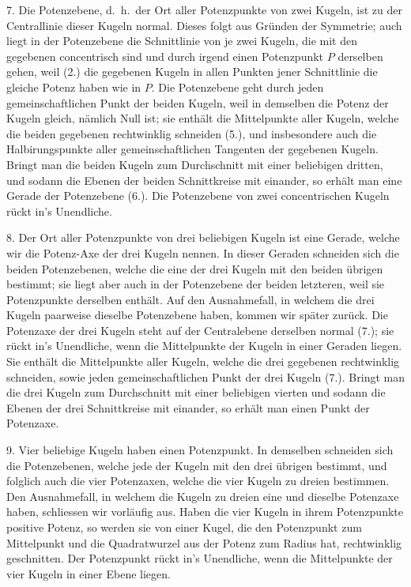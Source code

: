 7. Die Potenzebene, d.~h.\ der Ort aller Potenzpunkte
von zwei Kugeln, ist zu der Centrallinie dieser Kugeln normal.
Dieses folgt aus Gr\"unden der Symmetrie; auch liegt
in der Potenzebene die Schnittlinie von je zwei Kugeln, die
mit den gegebenen concentrisch sind und durch irgend einen
Potenzpunkt $P$ derselben gehen, weil (2.) die gegebenen
Kugeln in allen Punkten jener Schnittlinie die gleiche Potenz
haben wie in $P$. Die Potenzebene geht durch jeden
gemeinschaftlichen Punkt der beiden Kugeln, weil in demselben
die Potenz der Kugeln gleich, n\"amlich Null ist; sie
enth\"alt die Mittelpunkte aller Kugeln, welche die beiden gegebenen
rechtwinklig schneiden (5.), und insbesondere auch
die Halbirungspunkte aller gemeinschaftlichen Tangenten der
gegebenen Kugeln. Bringt man die beiden Kugeln zum
Durchschnitt mit einer beliebigen dritten, und sodann die
Ebenen der beiden Schnittkreise mit einander, so erh\"alt man
eine Gerade der Potenzebene (6.). Die Potenzebene von zwei
concentrischen Kugeln r\"uckt in's Unendliche.

8. Der Ort aller Potenzpunkte von drei beliebigen Kugeln
ist eine Gerade, welche wir die {\glqq}Potenz-Axe{\grqq} der drei
Kugeln nennen. In dieser Geraden schneiden sich die beiden
Potenzebenen, welche die eine der drei Kugeln mit den
beiden \"ubrigen bestimmt; sie liegt aber auch in der Potenzebene
der beiden letzteren, weil sie Potenzpunkte derselben
enth\"alt. Auf den Ausnahmefall, in welchem die drei Kugeln
paarweise dieselbe Potenzebene haben, kommen wir sp\"ater
zur\"uck. Die Potenzaxe der drei Kugeln steht auf der Centralebene
derselben normal (7.); sie r\"uckt in's Unendliche,
wenn die Mittelpunkte der Kugeln in einer Geraden liegen.
Sie enth\"alt die Mittelpunkte aller Kugeln, welche die drei
gegebenen rechtwinklig schneiden, sowie jeden gemeinschaftlichen
Punkt der drei Kugeln (7.). Bringt man die drei
Kugeln zum Durchschnitt mit einer beliebigen vierten und
sodann die Ebenen der drei Schnittkreise mit einander, so
erh\"alt man einen Punkt der Potenzaxe.

9. Vier beliebige Kugeln haben einen Potenzpunkt. In
demselben schneiden sich die Potenzebenen, welche jede der
Kugeln mit den drei \"ubrigen bestimmt, und folglich auch
die vier Potenzaxen, welche die vier Kugeln zu dreien bestimmen.
Den Ausnahmefall, in welchem die Kugeln zu
dreien eine und dieselbe Potenzaxe haben, schliessen wir
vorl\"aufig aus. Haben die vier Kugeln in ihrem Potenzpunkte
positive Potenz, so werden sie von einer Kugel, die den Potenzpunkt
zum Mittelpunkt und die Quadratwurzel aus der
Potenz zum Radius hat, rechtwinklig geschnitten. Der Potenzpunkt
r\"uckt in's Unendliche, wenn die Mittelpunkte der
vier Kugeln in einer Ebene liegen.

